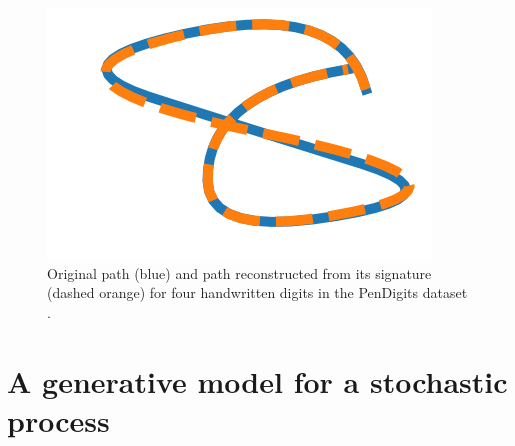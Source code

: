 \documentclass{article}
\theoremstyle{plain}
\theoremstyle{definition}
\begin{document}
\begin{figure}
\begin{minipage}{.2\textwidth}
\end{minipage}
\begin{minipage}{.2\textwidth}
  \centering
  \includegraphics[width=0.9\linewidth]{figures/8}
\end{minipage}%
\caption{Original path (blue) and path reconstructed from its signature (dashed orange) for four handwritten digits in the PenDigits dataset \cite{UCI}.}
\label{fig:invertedsig}
\end{figure}

\section{A generative model for a stochastic process}
\end{document}
